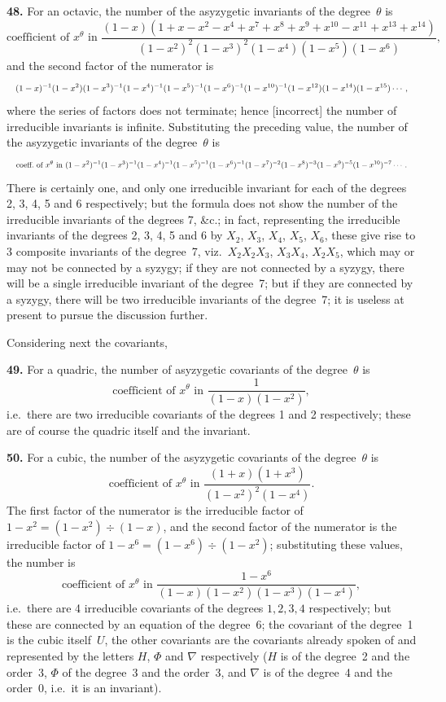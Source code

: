 \documentclass[11pt]{article}
\begin{document}
\textbf{48.} For an octavic, the number of the asyzygetic invariants of the degree~$\theta$ is
\[
\text{coefficient of } x^\theta \text{ in } \frac{(1-x)(1+x-x^2-x^4+x^7+x^8+x^9+x^{10}-x^{11}+x^{13}+x^{14})}{(1-x^2)^2(1-x^3)^2(1-x^4)(1-x^5)(1-x^6)},
\]
and the second factor of the numerator is
\[ \resizebox{\textwidth}{!}{$\displaystyle
(1-x)^{-1}(1-x^2)(1-x^3)^{-1}(1-x^4)^{-1}(1-x^5)^{-1}(1-x^6)^{-1}(1-x^{10})^{-1}(1-x^{12})(1-x^{14})(1-x^{15})\cdots,
$} \]
where the series of factors does not terminate; hence [incorrect] the number of irreducible invariants is infinite. Substituting the preceding value, the number of the asyzygetic invariants of the degree~$\theta$ is
\[ \resizebox{\textwidth}{!}{$\displaystyle
\text{coeff.\ of } x^\theta \text{ in } (1-x^2)^{-1}(1-x^3)^{-1}(1-x^4)^{-1}(1-x^5)^{-1}(1-x^6)^{-1}(1-x^7)^{-2}(1-x^8)^{-3}(1-x^9)^{-5}(1-x^{10})^{-7}\cdots.
$} \]
There is certainly one, and only one irreducible invariant for each of the degrees 2, 3, 4, 5 and 6 respectively; but the formula does not show the number of the irreducible invariants of the degrees 7, \&c.; in fact, representing the irreducible invariants of the degrees 2, 3, 4, 5 and 6 by $X_2$, $X_3$, $X_4$, $X_5$, $X_6$, these give rise to 3 composite invariants of the degree~7, viz.\ $X_2 X_2 X_3$, $X_3 X_4$, $X_2 X_5$, which may or may not be connected by a syzygy; if they are not connected by a syzygy, there will be a single irreducible invariant of the degree~7; but if they are connected by a syzygy, there will be two irreducible invariants of the degree~7; it is useless at present to pursue the discussion further.

Considering next the covariants,

\textbf{49.} For a quadric, the number of asyzygetic covariants of the degree~$\theta$ is
\[
\text{coefficient of } x^\theta \text{ in } \frac{1}{(1-x)(1-x^2)},
\]
i.e.\ there are two irreducible covariants of the degrees 1 and 2 respectively; these are of course the quadric itself and the invariant.

\textbf{50.} For a cubic, the number of the asyzygetic covariants of the degree~$\theta$ is
\[
\text{coefficient of } x^\theta \text{ in } \frac{(1+x)(1+x^3)}{(1-x^2)^2(1-x^4)}.
\]
The first factor of the numerator is the irreducible factor of $1-x^2 = (1-x^2)\div(1-x)$, and the second factor of the numerator is the irreducible factor of $1-x^6 = (1-x^6)\div(1-x^2)$; substituting these values, the number is
\[
\text{coefficient of } x^\theta \text{ in } \frac{1-x^6}{(1-x)(1-x^2)(1-x^3)(1-x^4)},
\]
i.e.\ there are 4 irreducible covariants of the degrees $1, 2, 3, 4$ respectively; but these are connected by an equation of the degree~6; the covariant of the degree~1 is the cubic itself~$U$, the other covariants are the covariants already spoken of and represented by the letters $H$, $\Phi$ and $\nabla$ respectively ($H$ is of the degree~2 and the order~3, $\Phi$ of the degree~3 and the order~3, and $\nabla$ is of the degree~4 and the order~0, i.e.\ it is an invariant).
\end{document}

